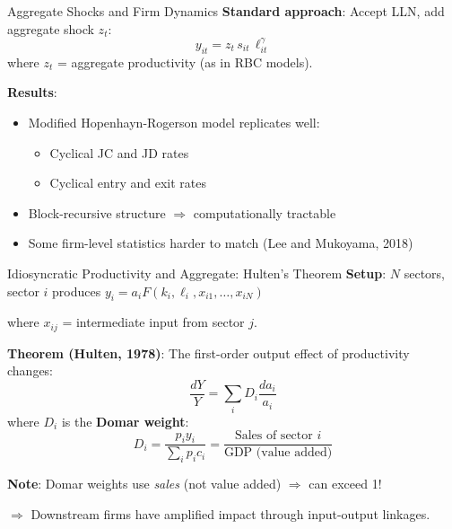 \documentclass[blue]{beamer}
\begin{document}
\begin{frame}{Aggregate Shocks and Firm Dynamics}
	\textbf{Standard approach}: Accept LLN, add aggregate shock $z_t$:
	\[
	y_{it} = z_t \, s_{it} \, \ell_{it}^\gamma
	\]
	where $z_t$ = aggregate productivity (as in RBC models).
	
	\bigskip
	\textbf{Results}:
	\begin{itemize}
		\item Modified Hopenhayn-Rogerson model replicates well:
		\begin{itemize}
			\item Cyclical JC and JD rates
			\item Cyclical entry and exit rates
		\end{itemize}
		\item Block-recursive structure $\Rightarrow$ computationally tractable
		\item Some firm-level statistics harder to match (Lee and Mukoyama, 2018)
	\end{itemize}
\end{frame}

\begin{frame}{Idiosyncratic Productivity and Aggregate: Hulten's Theorem}
	\textbf{Setup}: $N$ sectors, sector $i$ produces $y_i = a_i F(k_i, \ell_i, x_{i1}, \ldots, x_{iN})$
	
	where $x_{ij}$ = intermediate input from sector $j$.
	
	\bigskip
	\textbf{Theorem (Hulten, 1978)}: The first-order output effect of productivity changes:
	\[
\frac{dY}{Y} = \sum_i D_i \frac{da_i}{a_i}
	\]
	where $D_i$ is the \textbf{Domar weight}:
	\[
	D_i = \frac{p_i y_i}{\sum_i p_i c_i} = \frac{\text{Sales of sector } i}{\text{GDP (value added)}}
	\]
	
	\bigskip
	\textbf{Note}: Domar weights use \emph{sales} (not value added) $\Rightarrow$ can exceed 1!
	
	$\Rightarrow$ Downstream firms have amplified impact through input-output linkages.
\end{frame}
\end{document}
